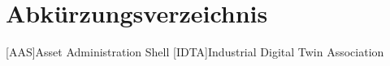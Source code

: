 \section*{Abkürzungsverzeichnis}
\begin{singlespacing}
\end{singlespacing}
\begin{acronym}

[AAS]{Asset Administration Shell}
[IDTA]{Industrial Digital Twin Association}

\end{acronym}



\newpage
